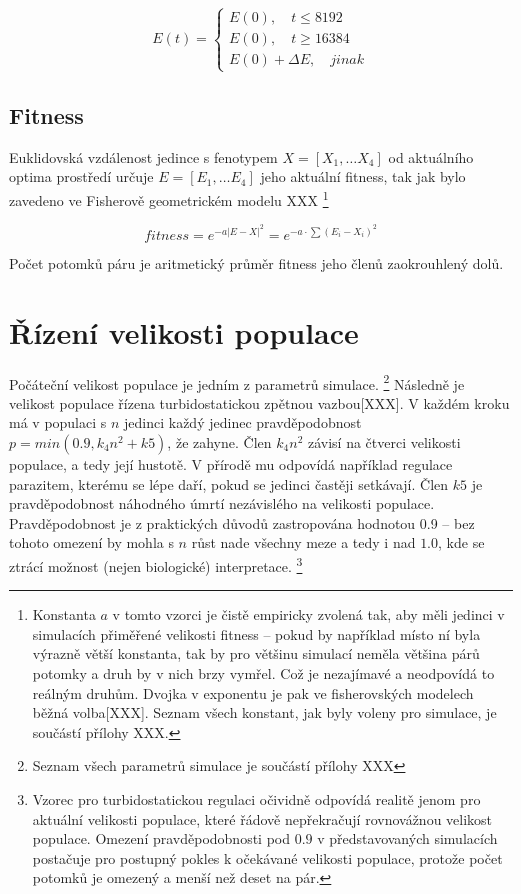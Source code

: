 \begin{equation}
E(t) = \left \{
     \begin{array}{l} E(0), \quad t \leq 8192 \\
                      E(0), \quad t \geq 16384 \\
                      E(0) + \Delta{E}, \quad jinak
     \end{array} \right .
\end{equation}

\subsection{Fitness}

Euklidovská vzdálenost jedince s fenotypem $X = [X_1,\dots{}X_4]$ od aktuálního optima prostředí určuje
$E = [E_1,\dots{} E_4]$ jeho aktuální fitness, tak jak bylo zavedeno ve Fisherově geometrickém modelu XXX
\footnote{Konstanta $a$ v tomto vzorci je čistě empiricky zvolená tak, aby měli jedinci v simulacích
přiměřené velikosti fitness -- pokud by například místo ní byla výrazně větší konstanta, tak by pro většinu simulací
neměla většina párů potomky a druh by v nich brzy vymřel. Což je nezajímavé a neodpovídá to reálným druhům.
Dvojka v exponentu je pak ve fisherovských modelech běžná volba[XXX].
Seznam všech konstant, jak byly voleny pro simulace, je součástí přílohy XXX.}

\begin{equation}
fitness = e^{-a |E-X|^2} = e^{-a\cdot{\sum{(E_i - X_i)^2}}}
\end{equation}

Počet potomků páru je aritmetický průměr fitness jeho členů zaokrouhlený dolů.


\section{Řízení velikosti populace}

Počáteční velikost populace je jedním z parametrů simulace.
\footnote{Seznam všech parametrů simulace je součástí přílohy XXX}
Následně je velikost populace řízena turbidostatickou
zpětnou vazbou[XXX]. V každém kroku má v populaci s $n$ jedinci každý jedinec pravděpodobnost
$p = min(0.9, k_4 n^2 + k5)$, že zahyne. Člen $k_4 n^2$ závisí na čtverci velikosti populace, a tedy její hustotě.
V přírodě mu odpovídá například regulace parazitem, kterému se lépe daří, pokud se jedinci častěji setkávají.
Člen $k5$ je pravděpodobnost náhodného úmrtí nezávislého na velikosti populace. Pravděpodobnost je z praktických důvodů
zastropována hodnotou 0.9 -- bez tohoto omezení by mohla s $n$ růst nade všechny meze a tedy i nad $1.0$, kde se ztrácí
možnost (nejen biologické) interpretace.
\footnote{Vzorec pro turbidostatickou regulaci očividně odpovídá realitě jenom pro aktuální velikosti populace,
které řádově nepřekračují rovnovážnou velikost populace. Omezení pravděpodobnosti pod $0.9$ v představovaných
simulacích postačuje pro postupný pokles k očekávané velikosti populace, protože počet potomků je omezený a
menší než deset na pár.}

